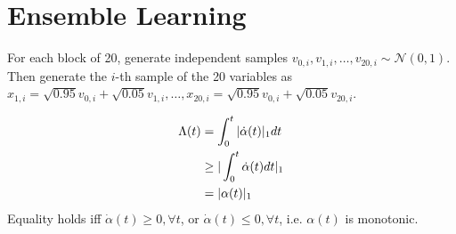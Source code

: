 \chapter{Ensemble Learning}
\label{ch:16}

\begin{exercise}
  For each block of 20, generate independent samples
  $v_{0,i},v_{1,i},\ldots,v_{20,i} \sim\mathcal{N}(0, 1)$. Then generate the
  $i$-th sample of the 20 variables as $x_{1,i}=\sqrt{0.95}v_{0,i} +
  \sqrt{0.05}v_{1,i},\ldots, x_{20,i}=\sqrt{0.95}v_{0,i} + \sqrt{0.05}v_{20,i}$.
\end{exercise}

\begin{exercise}
  \begin{align}
    \Lambda(t) &= \int_0^t|\dot{\alpha}(t)|_1dt \notag \\
    & \geq |\int_0^t\dot{\alpha}(t)dt|_1 \notag \\
    & = |\alpha(t)|_1
  \end{align}
  Equality holds iff $\dot{\alpha}(t)\geq 0, \forall t$, or $\dot{\alpha}(t)\leq
  0, \forall t$, i.e. $\alpha(t)$ is monotonic.
\end{exercise}

